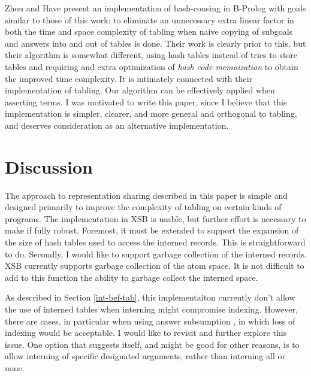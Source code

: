 \documentclass{llncs}
\begin{document}
Zhou and Have \cite{zhou-hash-consing} present an implementation of
hash-consing in B-Prolog with goals similar to those of this work: to
eliminate an unnecessary extra linear factor in both the time and
space complexity of tabling when naive copying of subgoals and answers
into and out of tables is done.  Their work is clearly prior to this,
but their algorithm is somewhat different, using hash tables instead
of tries to store tables and requiring and extra optimization of {\em
hash code memoization} to obtain the improved time complexity. It is
intimately connected with their implementation of tabling.  Our
algorithm can be effectively applied when asserting terms.  I was
motivated to write this paper, since I believe that this
implementation is simpler, clearer, and more general and orthogonal to
tabling, and deserves consideration as an alternative implementation.

\section{Discussion}
The approach to representation sharing described in this
paper is simple and designed primarily to improve the complexity of
tabling on certain kinds of programs.  The implementation in XSB is
usable, but further effort is necessary to make if fully robust.
Foremost, it must be extended to support the expansion of the size of
hash tables used to access the interned records.  This is
straightforward to do.  Secondly, I would like to support garbage
collection of the interned records.  XSB currently supports garbage
collection of the atom space.  It is not difficult to add to this
function the ability to garbage collect the interned space.

As described in Section \ref{int-bef-tab}, this implementaiton
currently don't allow the use of interned tables when interning might
compromise indexing.  However, there are cases, in particular when
using answer subsumption
\cite{answersubs:jelia},
in which loss of indexing would be acceptable.  I would like to
revisit and further explore this issue.  One option that suggests
itself, and might be good for other reasons, is to allow interning of
specific designated arguments, rather than interning all or none.






\clearpage
\end{document}
